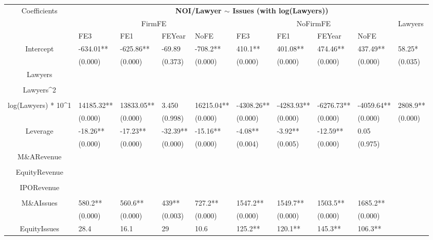 \documentclass{article}
\begin{document}
\begin{table}[H]
\centering
\begin{tabular}{|clllllllll|}
\hline
\multirow{3}{*}{Coefficients} & \multicolumn{9}{c|}{\textbf{NOI/Lawyer $\sim$ Issues (with log(Lawyers))}} \\
\cline{2-10}
& \multicolumn{4}{c}{FirmFE} & \multicolumn{4}{c}{NoFirmFE} & \multirow{2}{*}{Lawyers} \\
\cline{2-9}
& FE3 & FE1 & FEYear & NoFE & FE3 & FE1 & FEYear & NoFE &  \\
\hline
 
Intercept & -634.01** & -625.86** & -69.89 & -708.2** & 410.1** & 401.08** & 474.46** & 437.49** & 58.25* \\ 
   & (0.000) & (0.000) & (0.373) & (0.000) & (0.000) & (0.000) & (0.000) & (0.000) & (0.035) \\ 
  Lawyers &  &  &  &  &  &  &  &  &  \\ 
   &  &  &  &  &  &  &  &  &  \\ 
  Lawyers^2 &  &  &  &  &  &  &  &  &  \\ 
   &  &  &  &  &  &  &  &  &  \\ 
  log(Lawyers) * 10^1 & 14185.32** & 13833.05** & 3.450 & 16215.04** & -4308.26** & -4283.93** & -6276.73** & -4059.64** & 2808.9** \\ 
   & (0.000) & (0.000) & (0.998) & (0.000) & (0.000) & (0.000) & (0.000) & (0.000) & (0.000) \\ 
  Leverage & -18.26** & -17.23** & -32.39** & -15.16** & -4.08** & -3.92** & -12.59** & 0.05 &  \\ 
   & (0.000) & (0.000) & (0.000) & (0.000) & (0.004) & (0.005) & (0.000) & (0.975) &  \\ 
  M\&ARevenue &  &  &  &  &  &  &  &  &  \\ 
   &  &  &  &  &  &  &  &  &  \\ 
  EquityRevenue &  &  &  &  &  &  &  &  &  \\ 
   &  &  &  &  &  &  &  &  &  \\ 
  IPORevenue &  &  &  &  &  &  &  &  &  \\ 
   &  &  &  &  &  &  &  &  &  \\ 
  M\&AIssues & 580.2** & 560.6** & 439** & 727.2** & 1547.2** & 1549.7** & 1503.5** & 1685.2** &  \\ 
   & (0.000) & (0.000) & (0.003) & (0.000) & (0.000) & (0.000) & (0.000) & (0.000) &  \\ 
  EquityIssues & 28.4 & 16.1 & 29 & 10.6 & 125.2** & 120.1** & 145.3** & 106.3** &  \\ 

\end{tabular}
\end{table}
\end{document}
